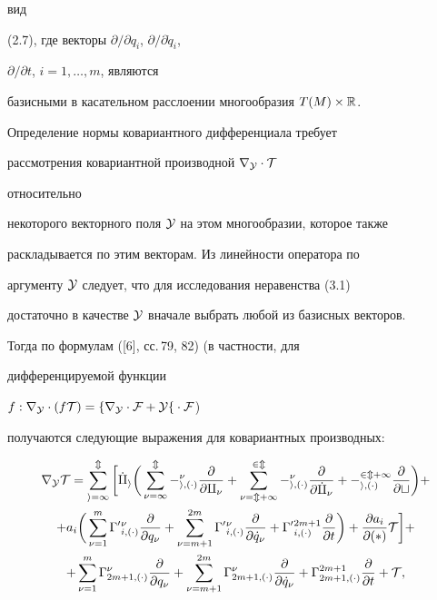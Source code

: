вид 


(2.7), где векторы $\partial/\partial q_i$, $\partial/\partial \Dot q_i$, 


$\partial/\partial t$, $i=1,\dotsc,m$, являются 


базисными в касательном расслоении многообразия $T(M)\times\Bbb R$. 


Определение нормы ковариантного дифференциала требует 


рассмотрения ковариантной производной $\nabla_{\cal Y}\cdot\cal T$ 


относительно 


некоторого векторного поля $\cal Y$ на этом многообразии, которое также 


раскладывается по этим векторам. Из линейности оператора по 


аргументу $\cal Y$ следует, что для исследования неравенства (3.1) 


достаточно в качестве $\cal Y$ вначале выбрать любой из базисных векторов. 


Тогда по формулам ([6], сс.\,79, 82) (в частности, для 


дифференцируемой функции 


$f:\nabla_{\cal Y}\cdot(f\cal T)=f\nabla_{\cal Y}\cdot\cal F+\cal Y 


f\cdot \cal F$) 


получаются следующие выражения для ковариантных производных: 


\begin{multline} 


\nabla_{\cal Y}\cal T=\sum^m_{i=1}\bigg[\Dot q_i\bigg( 


\sum^m_{\nu=1}\Gamma^\nu_{i,(\cdot)} 


\frac{\partial}{\partial q_\nu}+\sum^{2m}_{\nu=m+1} 


\Gamma^\nu_{i,(\cdot)}\frac{\partial}{\partial\Dot q_\nu} 


+\Gamma^{2m+1}_{i,(\cdot)}\frac{\partial}{\partial t}\bigg)+ \\ 


% 


+a_i\bigg(\sum^m_{\nu=1}\Gamma'{}^\nu_{i,(\cdot)} 


\frac{\partial}{\partial q_\nu}+\sum^{2m}_{\nu=m+1} 


\Gamma'{}^\nu_{i,(\cdot)}\frac{\partial}{\partial\Dot q_\nu} 


+\Gamma'{}^{2m+1}_{i,(\cdot)}\frac{\partial}{\partial t}\bigg)+ 


\frac{\partial a_i}{\partial(\ast)}\cal T\bigg]+\\ 


% 


+\sum^m_{\nu=1}\Gamma^\nu_{2m+1,(\cdot)} 


\frac{\partial}{\partial q_\nu}+\sum^{2m}_{\nu=m+1} 


\Gamma^\nu_{2m+1,(\cdot)}\frac{\partial}{\partial\Dot q_\nu}+ 


\Gamma^{2m+1}_{2m+1,(\cdot)}\frac{\partial}{\partial t} 


+\cal T, 


\end{multline} 


